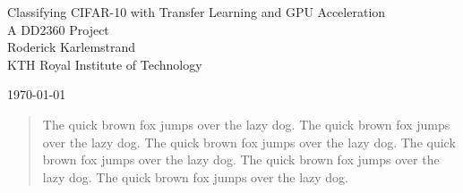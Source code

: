 \documentclass[11pt,a4paper]{report}
\begin{document}
\begin{titlepage}

\centering
\vspace{10cm}
\huge Classifying CIFAR-10 with Transfer Learning and GPU Acceleration \\
\vspace{3cm}
\large A DD2360 Project\\
\Large Roderick Karlemstrand\\
\Large KTH Royal Institute of Technology \\



\vspace{3cm}

\daymonthyear\today \\
\end{titlepage}



\begin{abstract}




The quick brown fox jumps over the lazy dog. The quick brown fox jumps over the lazy dog. The quick brown fox jumps over the lazy dog. The quick brown fox jumps over the lazy dog. The quick brown fox jumps over the lazy dog. The quick brown fox jumps over the lazy dog.

\end{abstract}
\end{document}

